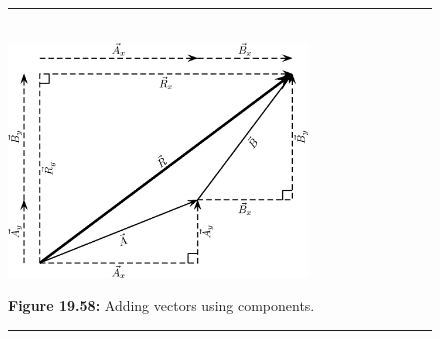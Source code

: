     \setcounter{subfigure}{0}


	\begin{figure}[H] %
    \begin{center}
    \rule[.1in]{\figurerulewidth}{.005in} \\
        \label{m38819*uid70!!!underscore!!!media}\label{m38819*uid70!!!underscore!!!printimage}\includegraphics[width=300px]{col11305.imgs/m38819_PG11C1_065.png} %
        
      \vspace{2pt}
    \vspace{\rubberspace}\par \begin{cnxcaption}
	  \small \textbf{Figure 19.58: }Adding vectors using components.
	\end{cnxcaption}
      
    \vspace{.1in}
    \rule[.1in]{\figurerulewidth}{.005in} \\
        
    \end{center}

 \end{figure}   

    \addtocounter{footnote}{-0}
    
\par
            \label{m38819*secfhsst!!!underscore!!!id2504}\vspace{.5cm} 
      
